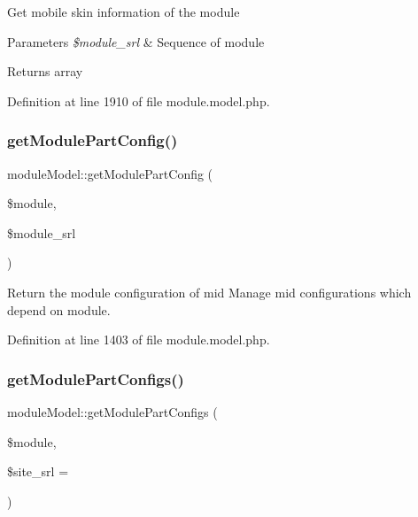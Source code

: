 Get mobile skin information of the module 
\begin{DoxyParams}{Parameters}
{\em \$module\+\_\+srl} & Sequence of module \\
\hline
\end{DoxyParams}
\begin{DoxyReturn}{Returns}
array 
\end{DoxyReturn}


Definition at line 1910 of file module.\+model.\+php.

\hypertarget{classmoduleModel_acfd93d46c26d88c3833b0801085e69ba}{}\label{classmoduleModel_acfd93d46c26d88c3833b0801085e69ba} 
\subsubsection{\texorpdfstring{get\+Module\+Part\+Config()}{getModulePartConfig()}}
{\footnotesize\ttfamily module\+Model\+::get\+Module\+Part\+Config (\begin{DoxyParamCaption}\item[{}]{\$module,  }\item[{}]{\$module\+\_\+srl }\end{DoxyParamCaption})}



Return the module configuration of mid Manage mid configurations which depend on module. 



Definition at line 1403 of file module.\+model.\+php.

\hypertarget{classmoduleModel_a3e50f170f709853c8adf5c8f759e08ca}{}\label{classmoduleModel_a3e50f170f709853c8adf5c8f759e08ca} 
\subsubsection{\texorpdfstring{get\+Module\+Part\+Configs()}{getModulePartConfigs()}}
{\footnotesize\ttfamily module\+Model\+::get\+Module\+Part\+Configs (\begin{DoxyParamCaption}\item[{}]{\$module,  }\item[{}]{\$site\+\_\+srl = {} }\end{DoxyParamCaption})}



